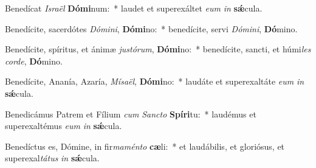 \item Benedícat \textit{Is}\textit{ra}\textit{ël} \textbf{Dó}\textbf{mi}num:~* laudet et superexáltet \textit{e}\textit{um} \textit{in} \textbf{sǽ}cula.
\item Benedícite, sacerdótes \textit{Dó}\textit{mi}\textit{ni}, \textbf{Dó}\textbf{mi}no:~* benedícite, servi \textit{Dó}\textit{mi}\textit{ni}, \textbf{Dó}mino.
\item Benedícite, spíritus, et ánimæ \textit{jus}\textit{tó}\textit{rum}, \textbf{Dó}\textbf{mi}no:~* benedícite, sancti, et húmi\textit{les} \textit{cor}\textit{de}, \textbf{Dó}mino.
\item Benedícite, Ananía, Azaría, \textit{Mí}\textit{sa}\textit{ël}, \textbf{Dó}\textbf{mi}no:~* laudáte et superexaltáte \textit{e}\textit{um} \textit{in} \textbf{sǽ}cula.
\item Benedicámus Patrem et Fílium \textit{cum} \textit{Sanc}\textit{to} \textbf{Spí}\textbf{ri}tu:~* laudémus et superexaltémus \textit{e}\textit{um} \textit{in} \textbf{sǽ}cula.
\item Benedíctus es, Dómine, in fir\textit{ma}\textit{mén}\textit{to} \textbf{cæ}li:~* et laudábilis, et gloriósus, et superexal\textit{tá}\textit{tus} \textit{in} \textbf{sǽ}cula.
